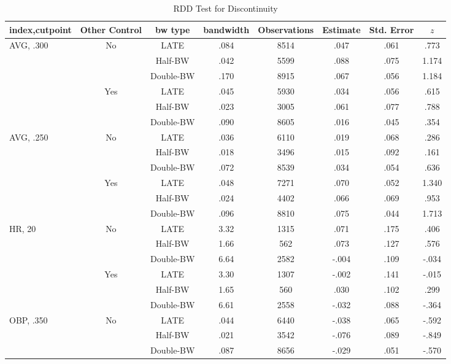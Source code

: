 \documentclass[dvipdfmx, 12pt]{article}
\begin{document}
\begin{table}[!]
  \caption{RDD Test for Discontinuity}
  \label{RDD_A}
  \tiny
  \centering
  \begin{tabular}{lccccccc}\hline
    index,cutpoint & Other Control & bw type & bandwidth
    & Observations & Estimate & Std. Error & $z$
    \\ \hline \hline
    AVG, .300 & No &LATE & .084 & 8514 & .047 & .061 & .773 \\
    & &Half-BW &  .042 & 5599 & .088 & .075 & 1.174 \\
    & & Double-BW & .170 & 8915  & .067 & .056 & 1.184 \\ \cline{3-8}

    & Yes &LATE & .045 & 5930 & .034 & .056 & .615 \\
    & &Half-BW &  .023 & 3005 & .061 & .077 & .788 \\
    & & Double-BW & .090 & 8605  & .016 & .045 & .354 \\ \hline

    AVG, .250 & No &LATE & .036 & 6110 & .019 & .068 & .286 \\
    & &Half-BW &  .018 & 3496 & .015 & .092 & .161 \\
    & & Double-BW & .072 & 8539  & .034 & .054 & .636 \\ \cline{3-8}

    & Yes &LATE & .048 & 7271 & .070 & .052 & 1.340 \\
    & &Half-BW &  .024 & 4402 & .066 & .069 & .953 \\
    & & Double-BW & .096 & 8810  & .075 & .044 & 1.713 \\ \hline

    HR, 20 & No & LATE & 3.32 & 1315 & .071 & .175 & .406 \\
    & & Half-BW & 1.66 & 562 & .073 & .127 & .576 \\
    & & Double-BW & 6.64 & 2582 & -.004 & .109 & -.034 \\ \cline{3-8}

    & Yes & LATE & 3.30 & 1307 & -.002 & .141 & -.015\\
    & & Half-BW &1.65 & 560 & .030 & .102 & .299 \\
    & & Double-BW & 6.61 & 2558 & -.032 & .088 & -.364 \\ \hline

    OBP, .350 & No &LATE & .044 & 6440 & -.038 & .065 & -.592 \\
    & & Half-BW & .021 & 3542 & -.076 & .089 & -.849 \\
    & & Double-BW & .087 & 8656 & -.029 & .051 & -.570 \\ \cline{3-8}


\end{tabular}
\end{table}
\end{document}
